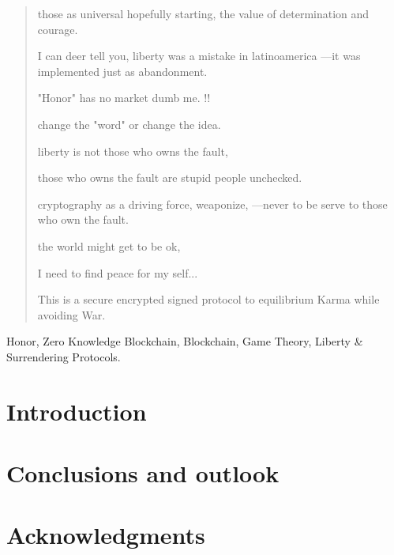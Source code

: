 \documentclass[a4paper,fleqn]{cas-sc}
\begin{document}
\begin{abstract}
  those as universal hopefully starting, the value of determination and courage. 

  I can deer tell you, liberty was a mistake in latinoamerica ---it was implemented just as abandonment. 

  "Honor" has no market dumb me. !!

  change the "word" or change the idea.

  liberty is not those who owns the fault, 

  those who owns the fault are stupid people unchecked. 

  cryptography as a driving force, weaponize, 
  ---never to be serve to those who own the fault. 

  the world might get to be ok, 

  I need to find peace for my self...

  This is a secure encrypted signed protocol 
  to equilibrium Karma while avoiding War. 
  
\end{abstract}
 \begin{keywords}
  Honor, Zero Knowledge Blockchain, Blockchain, Game Theory, Liberty \& Surrendering Protocols. 
 \end{keywords}

 \maketitle

\section{Introduction}

\section{}
\section{}
\section{}

\section{Conclusions and outlook}

\section{Acknowledgments}



\end{document}
